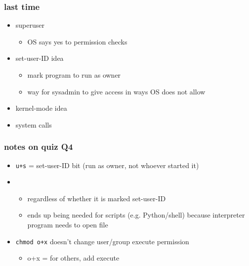 \date{}
\title{}
\date{}

\begin{frame}
    \titlepage
\end{frame}



\begin{frame}
\frametitle{last time}
\begin{itemize}
\item superuser
    \begin{itemize}
    \item OS says yes to permission checks
    \end{itemize}
\item set-user-ID idea
    \begin{itemize}
    \item mark program to run as owner
    \item way for sysadmin to give access in ways OS does not allow
    \end{itemize}
\item kernel-mode idea
\item system calls
\end{itemize}
\end{frame}

\begin{frame}
\frametitle{notes on quiz Q4}
\begin{itemize}
\item \texttt{u+s} = set-user-ID bit (run as owner, not whoever started it)
\item {}
    \begin{itemize}
    \item regardless of whether it is marked set-user-ID
    \item ends up being needed for scripts (e.g. Python/shell) because interpreter program needs to open file
    \end{itemize}
\item \texttt{chmod o+x} doesn't change user/group execute permission
    \begin{itemize}
    \item o+x = for others, add execute
    \end{itemize}
\end{itemize}
\end{frame}





